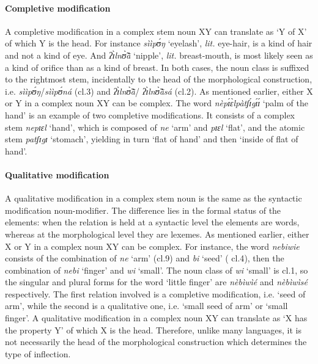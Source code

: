 \begin{exe}
\begin{exe}
\begin{exe}
{\begin{exe}
\begin{exe}
\begin{exe}
\begin{exe}
\paragraph{Completive modification}
\label{sec:GRM-comp-completive}

A completive modification in a complex stem noun XY can translate as `Y of X' of 
which Y is the head. For instance {\it sììpʊ́ŋ}   `eyelash', {\it lit.} 
eye-hair, is a kind of hair and not a kind of eye. And {\it ʔɪ̀lnʊ̃̀ã̀} 
`nipple', {\it lit.} breast-mouth, is most likely seen as a kind of orifice than 
as  a kind of breast.  In both cases, the noun class is suffixed to the 
rightmost stem, incidentally to the head of the morphological construction, i.e. 
{\it sììpʊ́ŋ}/{\it sììpʊ́ná} {\sc (cl.3)} and {\it ʔɪ̀lnʊ̃̀ã̀}/{\it 
ʔɪ̀lnʊ̃̀ã̀sá} {\sc (cl.2)}. As mentioned earlier,  either X or Y  in a complex 
noun XY can be complex. The word {\it nèpɪ́ɛ̀lpàtʃɪ́gɪ́ɪ́} `palm of the hand' 
is an example of two completive modifications. It consists of a complex stem 
{\it nepɪɛl} `hand', which is composed of  {\it ne} `arm' and {\it pɪɛl} `flat', 
and the atomic stem {\it patʃɪgɪ} `stomach', yielding in turn  `flat of hand' 
and then `inside of flat of hand'. 


\paragraph{Qualitative modification}
\label{sec:GRM-comp-quality}

A qualitative modification in a complex stem noun is the same as the  syntactic
modification  noun-modifier. The difference lies in the formal status of the
elements: when the
relation is held at a syntactic level the elements are words, whereas at the
morphological level they are lexemes. As mentioned earlier,  either X or Y  in a
complex noun XY can be complex. For instance, the word {\it nebiwie} consists of
the combination of {\it ne}  `arm' ({\sc cl.9}) and {\it bi} `seed'    ({\sc
cl.4}), then the combination of {\it nebi} `finger' and {\it wi} `small'. The 
noun class  of {\it wi} `small'  is {\sc cl.1}, so the singular and plural
forms for the word `little finger' are {\it nèbìwìé} and  {\it nèbìwìsé}
respectively. The first relation involved is a completive modification, i.e.
`seed  of arm', while the second is a qualitative one, i.e. `small seed  of
arm' or `small finger'.  A qualitative modification in a complex noun XY can
translate as `X has
the property Y'  of which X is the head. Therefore, unlike many languages,  it
is not necessarily the head of the morphological construction which determines
the type of inflection.



\end{exe}
\end{exe}
\end{exe}
\end{exe}}
\end{exe}
\end{exe}
\end{exe}
